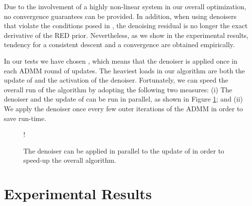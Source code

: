 \documentclass[12pt]{article}
\begin{document}
Due to the involvement of a highly non-linear system  in our overall optimization, no convergence guarantees can be provided. In addition, when using denoisers that violate the conditions posed in \cite{RED-2017}, the denoising residual  is no longer the exact derivative of the RED prior. Nevertheless, as we show in the experimental results, tendency for a consistent descent and a convergence are obtained empirically.  

In our tests we have chosen , which means that the denoiser  is applied once in each ADMM round of updates. The heaviest loads in our algorithm are both the update of  and the activation of the denoiser. Fortunately, we can speed the overall run of the algorithm by adopting the following two measures: (i) The denoiser and the update of  can be run in parallel, as shown in Figure \ref{figure:parallel}; and (ii) We apply the denoiser once every few outer iterations of the ADMM in order to save run-time.  



\begin{figure}[!htb]
\centering
\resizebox {.8\linewidth} {!} {
    }
\caption{The denoiser can be applied in parallel to the update of  in order to speed-up the overall algorithm.}
\label{fig:datafusionindirectdirectfc}
\label{figure:parallel}
\end{figure}







\section{Experimental Results}
\label{sec:experiments}
\end{document}
